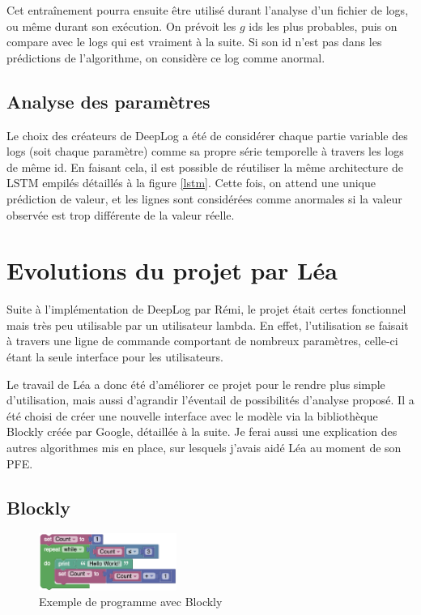 \documentclass[openany, 11pt]{memoir}
\begin{document}
\bigskip
Cet entraînement pourra ensuite être utilisé durant l'analyse d'un fichier de \glspl{log}, ou même durant son exécution. On prévoit les $g$ ids les plus probables, puis on compare avec le logs qui est vraiment à la suite. Si son id n'est pas dans les prédictions de l'algorithme, on considère ce log comme anormal.

\subsection{Analyse des paramètres}

Le choix des créateurs de DeepLog a été de considérer chaque partie variable des \glspl{log} (soit chaque paramètre) comme sa propre série temporelle à travers les logs de même id. En faisant cela, il est possible de réutiliser la même architecture de \gls{LSTM} empilés détaillés à la figure \ref{lstm}. Cette fois, on attend une unique prédiction de valeur, et les lignes sont considérées comme anormales si la valeur observée est trop différente de la valeur réelle.

\section{Evolutions du projet par Léa}

Suite à l'implémentation de DeepLog par Rémi, le projet était certes fonctionnel mais très peu utilisable par un utilisateur lambda. En effet, l'utilisation se faisait à travers une ligne de commande comportant de nombreux paramètres, celle-ci étant la seule interface pour les utilisateurs.

Le travail de Léa a donc été d'améliorer ce projet pour le rendre plus simple d'utilisation, mais aussi d'agrandir l'éventail de possibilités d'analyse proposé. Il a été choisi de créer une nouvelle interface avec le modèle via la bibliothèque Blockly créée par Google, détaillée à la suite. Je ferai aussi une explication des autres algorithmes mis en place, sur lesquels j'avais aidé Léa au moment de son PFE.

\subsection{Blockly}

\begin{figure}[ht]
	\centering
	\includegraphics[width=0.4\textwidth]{images/blockly.png}
	\caption{Exemple de programme avec Blockly}
	\label{blockly}
\end{figure}
\end{document}
